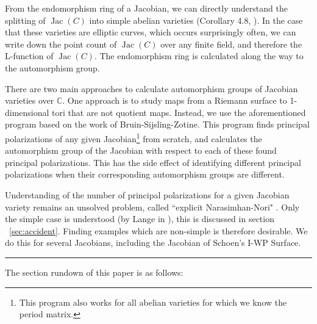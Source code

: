 \documentclass[12pt,reqno]{amsart}
\DeclareMathOperator{\Jac}{Jac}
\newcommand{\C}{\mathbb{C}}
\newcommand{\n}{\newline}
\theoremstyle{definition}
\theoremstyle{remark}
\newcommand{\ti}{\todo[inline]}
\begin{document}
From the endomorphism ring of a Jacobian, we can directly understand the splitting of $\Jac(C)$ into simple abelian varieties (Corollary 4.8, \cite{jeroen}). In the case that these varieties are elliptic curves, which occurs surprisingly often, we can write down the point count of $\Jac(C)$ over any finite field, and therefore the L-function of $\Jac(C)$. The endomorphism ring is calculated along the way to the automorphism group.


There are two main approaches to calculate automorphism groups of Jacobian varieties over $\C$. One approach is to study maps from a Riemann surface to 1-dimensional tori that are not quotient maps. Instead, we use the aforementioned program based on the work of Bruin-Sijsling-Zotine. This program finds principal polarizations of any given Jacobian\footnote{This program also works for all abelian varieties for which we know the period matrix.} from scratch, and calculates the automorphism group of the Jacobian with respect to each of these found principal polarizations. This has the side effect of identifying different principal polarizations when their corresponding automorphism groups are different. 
    
Understanding of the number of principal polarizations for a given Jacobian variety remains an unsolved problem, called ``explicit Narasimhan-Nori" \cite{nn}. Only the simple case is understood (by Lange in \cite{several}), this is discussed in section ~\ref{sec:accident}. Finding examples which are non-simple is therefore desirable. We do this for several Jacobians, including the Jacobian of Schoen's I-WP Surface.  



\vspace{+10pt}
\hrule 

$\text{}$\n The section rundown of this paper is as follows:
\vspace{+5pt}
\end{document}
